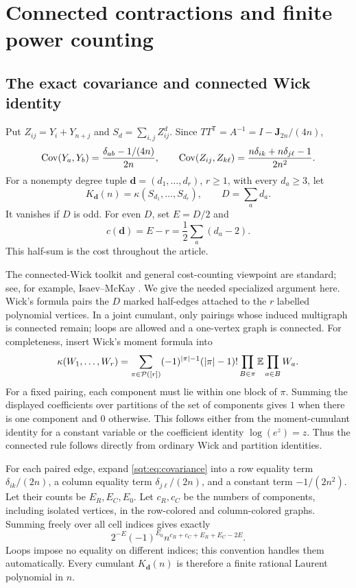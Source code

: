 \section{Connected contractions and finite power counting}\label{sqt:sec:diagrams}
\subsection{The exact covariance and connected Wick identity}
Put $Z_{ij}=Y_i+Y_{n+j}$ and $S_d=\sum_{i,j}Z_{ij}^d$. Since $TT^{\mathsf T}=A^{-1}=I-\mathbf J_{2n}/(4n)$,
\begin{equation}\label{sqt:eq:covariance}
\operatorname{Cov}(Y_a,Y_b)=\frac{\delta_{ab}-1/(4n)}{2n},\qquad
\operatorname{Cov}(Z_{ij},Z_{k\ell})=\frac{n\delta_{ik}+n\delta_{j\ell}-1}{2n^2}.
\end{equation}
For a nonempty degree tuple $\boldsymbol d=(d_1,\ldots,d_r)$, $r\geq1$, with every $d_a\geq3$, let
\[
K_{\boldsymbol d}(n)=\kappa(S_{d_1},\ldots,S_{d_r}),\qquad
D=\sum_a d_a.
\]
It vanishes if $D$ is odd. For even $D$, set $E=D/2$ and
\begin{equation}\label{sqt:eq:cost}
c(\boldsymbol d)=E-r=\frac12\sum_a(d_a-2).
\end{equation}
This half-sum is the cost throughout the article.

The connected-Wick toolkit and general cost-counting viewpoint are standard; see, for example, Isaev--McKay \cite[Theorems~2.2 and~2.4]{IM}. We give the needed specialized argument here. Wick's formula pairs the $D$ marked half-edges attached to the $r$ labelled polynomial vertices. In a joint cumulant, only pairings whose induced multigraph is connected remain; loops are allowed and a one-vertex graph is connected. For completeness, insert Wick's moment formula into
\begin{equation}\label{sqt:eq:cumulantpartition}
\kappa(W_1,\ldots,W_r)=
\sum_{\pi\in\mathcal P([r])}(-1)^{|\pi|-1}(|\pi|-1)!
 \prod_{B\in\pi}\mathbb E\prod_{a\in B}W_a.
\end{equation}
For a fixed pairing, each component must lie within one block of $\pi$. Summing the displayed coefficients over partitions of the set of components gives $1$ when there is one component and $0$ otherwise. This follows either from the moment-cumulant identity for a constant variable or the coefficient identity $\log(e^z)=z$. Thus the connected rule follows directly from ordinary Wick and partition identities.

For each paired edge, expand \eqref{sqt:eq:covariance} into a row equality term $\delta_{ik}/(2n)$, a column equality term $\delta_{j\ell}/(2n)$, and a constant term $-1/(2n^2)$. Let their counts be $E_R,E_C,E_0$. Let $c_R,c_C$ be the numbers of components, including isolated vertices, in the row-colored and column-colored graphs. Summing freely over all cell indices gives exactly
\begin{equation}\label{sqt:eq:colorweight}
2^{-E}(-1)^{E_0}n^{c_R+c_C+E_R+E_C-2E}.
\end{equation}
Loops impose no equality on different indices; this convention handles them automatically. Every cumulant $K_{\boldsymbol d}(n)$ is therefore a finite rational Laurent polynomial in $n$.

